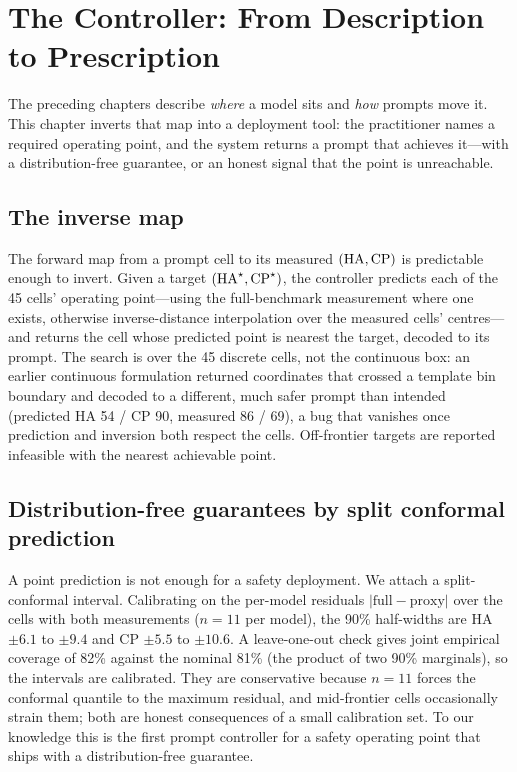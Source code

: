 \chapter{The Controller: From Description to Prescription}
\label{ch:controller}

The preceding chapters describe \emph{where} a model sits and \emph{how} prompts move it. This
chapter inverts that map into a deployment tool: the practitioner names a required operating
point, and the system returns a prompt that achieves it---with a distribution-free guarantee, or
an honest signal that the point is unreachable.

\section{The inverse map}

The forward map from a prompt cell to its measured $(\text{HA},\text{CP})$ is predictable enough to invert.
Given a target $(\text{HA}^\star,\text{CP}^\star)$, the controller predicts each of the 45 cells' operating
point---using the full-benchmark measurement where one exists, otherwise inverse-distance
interpolation over the measured cells' centres---and returns the cell whose predicted point is
nearest the target, decoded to its prompt. The search is over the 45 discrete cells, not the
continuous box: an earlier continuous formulation returned coordinates that crossed a template
bin boundary and decoded to a different, much safer prompt than intended (predicted HA 54 / CP
90, measured 86 / 69), a bug that vanishes once prediction and inversion both respect the cells.
Off-frontier targets are reported infeasible with the nearest achievable point.

\section{Distribution-free guarantees by split conformal prediction}

A point prediction is not enough for a safety deployment. We attach a split-conformal interval.
Calibrating on the per-model residuals $|\text{full}-\text{proxy}|$ over the cells with both
measurements ($n=11$ per model), the 90\% half-widths are HA $\pm 6.1$ to $\pm 9.4$ and CP
$\pm 5.5$ to $\pm 10.6$. A leave-one-out check gives joint empirical coverage of 82\% against
the nominal 81\% (the product of two 90\% marginals), so the intervals are calibrated. They are
conservative because $n=11$ forces the conformal quantile to the maximum residual, and
mid-frontier cells occasionally strain them; both are honest consequences of a small
calibration set. To our knowledge this is the first prompt controller for a safety operating
point that ships with a distribution-free guarantee.

